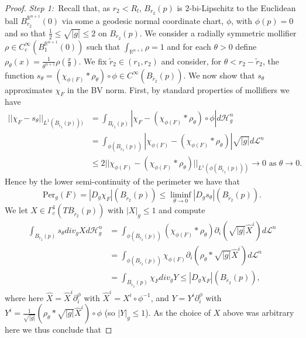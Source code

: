 \documentclass[11pt]{article}
\begin{document}
\begin{proof}
\textit{Step 1:}~Recall that, as $r_2 < R_l$, $B_{r_2}(p)$ is $2$-bi-Lipschitz to the Euclidean ball $B_{r_2}^{\mathbb{R}^{n+1}}(0)$ via some a geodesic normal coordinate chart, $\phi$, with $\phi(p) = 0$ and so that $\frac{1}{2} \leq \sqrt{|g|} \leq 2$ on $B_{r_2}(p)$. We consider a radially symmetric mollifier $\rho \in C^\infty_c(B^{\mathbb{R}^{n+1}}_1(0))$ such that $\int_{\mathbb{R}^{n+1}} \rho = 1$ and for each $\theta > 0$ define $\rho_\theta (x) = \frac{1}{\theta^{n+1}}\rho(\frac{x}{\theta})$. We fix $\tilde{r}_2 \in (r_1, r_2)$ and consider, for $\theta < r_2 - \tilde{r}_2$, the function $s_\theta = (\chi_{\phi(F)} * \rho_\theta) \circ \phi \in C^\infty(B_{\tilde{r}_2}(p))$. We now show that $s_\theta$ approximates $\chi_F$ in the BV norm. First, by standard properties of mollifiers we have
\begin{align*}
    ||\chi_F - s_\theta||_{L^1(B_{\tilde{r}_2}(p)))} &= \int_{B_{\tilde{r}_2}(p)} |\chi_F - (\chi_{\phi(F)} * \rho_\theta) \circ \phi| d\mathcal{H}^n_g\\
    &= \int_{\phi(B_{\tilde{r}_2}(p))} |\chi_{\phi(F)} - (\chi_{\phi(F)} * \rho_\theta)|\sqrt{|g|}d\mathcal{L}^n\\
    &\leq 2 || \chi_{\phi(F)} - (\chi_{\phi(F)} * \rho_\theta)||_{L^1(\phi(B_{\tilde{r}_2}(p)))} \rightarrow 0 \text{ as } \theta \rightarrow 0. 
\end{align*}
Hence by the lower semi-continuity of the perimeter we have that 
\begin{equation*}
    \mathrm{Per}_g(F) = |D_g \chi_F|(B_{\tilde{r}_2}(p)) \leq \liminf_{\theta \rightarrow 0} |D_g s_\theta|(B_{\tilde{r}_2}(p)).
\end{equation*}
We let $X \in \Gamma^1_c(TB_{\tilde{r}_2}(p))$ with $|X|_g \leq 1$ and compute
\begin{align*}
    \int_{B_{\tilde{r}_2}(p)} s_\theta div_g X d\mathcal{H}^n_g &= \int_{\phi(B_{\tilde{r}_2}(p))} (\chi_{\phi(F)}*\rho_\theta) \partial_i(\sqrt{|g|}\hat{X}^i)d\mathcal{L}^n\\
    &= \int_{\phi(B_{\tilde{r}_2}(p))} \chi_{\phi(F)} \partial_i(\rho_\theta *\sqrt{|g|}\hat{X}^i)d\mathcal{L}^n\\
    &= \int_{B_{\tilde{r}_2}(p)} \chi_F div_g Y \leq |D_g \chi_F|(B_{\tilde{r}_2}(p)),
\end{align*}
where here $\hat{X} = \hat{X}^i\partial_i^\phi$ with $\hat{X}^i = X^i \circ \phi^{-1}$, and $Y = Y^i\partial_i^\phi$ with $Y^i = \frac{1}{\sqrt{|g|}} (\rho_\theta * \sqrt{|g|} \hat{X}^i) \circ \phi$ (so $|Y|_g \leq 1$). As the choice of $X$ above was arbitrary here we thus conclude that 

\end{proof}
\end{document}
